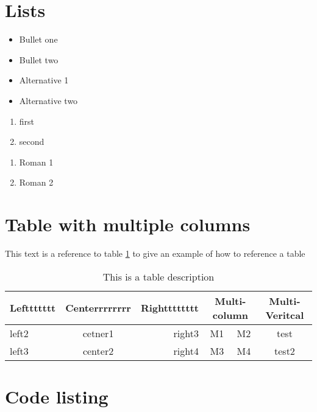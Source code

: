 \documentclass{article}
\begin{document}
\section{Lists}
\begin{itemize}
  \item Bullet one
  \item Bullet two
\end{itemize}

\begin{itemize}[label={$\ast$}]
  \item Alternative 1
  \item Alternative two
\end{itemize}

\begin{enumerate}
  \item first
  \item second
\end{enumerate}

\renewcommand{\labelenumi}{\Roman{enumi}}
\begin{enumerate}
  \item Roman 1
  \item Roman 2
\end{enumerate}

\section{Table with multiple columns}

This text is a reference to table \ref{table:1} to give an example of how to reference a table
\begin{table}[h!]
\begin{center}
  \begin{tabular}{ |l|c|r|c|c|c|c } 
   \hline
   Lefttttttt & Centerrrrrrrr & Rightttttttt &  \multicolumn{2}{c|}{Multi-column} &  \multicolumn{2}{c|}{Multi-Veritcal}  \\  
   \hline
   left2 & cetner1 & right3 & M1 & M2 & \multicolumn{2}{c|}{test}  \\ 
   left3 & center2 & right4 & M3 & M4 & \multicolumn{2}{c|}{test2} \\ 
   \hline
  \end{tabular}
  \caption{This is a table description}
  \label{table:1}
  \end{center}
\end{table}

\section{Code listing}
\end{document}
